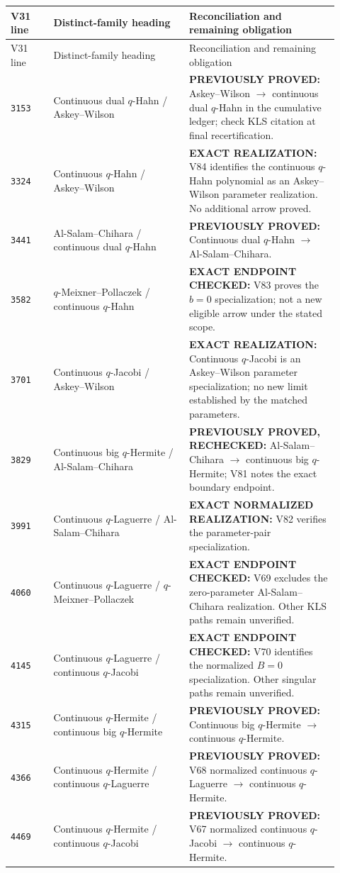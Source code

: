 \documentclass[11pt]{article}
\begin{document}
\begin{longtable}{@{}p{0.12\linewidth}p{0.38\linewidth}p{0.42\linewidth}@{}}
\toprule V31 line & Distinct-family heading & Reconciliation and remaining obligation \\
\midrule\endfirsthead
\toprule V31 line & Distinct-family heading & Reconciliation and remaining obligation \\
\midrule\endhead
\bottomrule\endfoot
\texttt{3153} & Continuous dual $q$-Hahn / Askey--Wilson & \textbf{PREVIOUSLY PROVED:} Askey--Wilson $\to$ continuous dual $q$-Hahn in the cumulative ledger; check KLS citation at final recertification. \\
\texttt{3324} & Continuous $q$-Hahn / Askey--Wilson & \textbf{EXACT REALIZATION:} V84 identifies the continuous $q$-Hahn polynomial as an Askey--Wilson parameter realization. No additional arrow proved. \\
\texttt{3441} & Al-Salam--Chihara / continuous dual $q$-Hahn & \textbf{PREVIOUSLY PROVED:} Continuous dual $q$-Hahn $\to$ Al-Salam--Chihara. \\
\texttt{3582} & $q$-Meixner--Pollaczek / continuous $q$-Hahn & \textbf{EXACT ENDPOINT CHECKED:} V83 proves the $b=0$ specialization; not a new eligible arrow under the stated scope. \\
\texttt{3701} & Continuous $q$-Jacobi / Askey--Wilson & \textbf{EXACT REALIZATION:} Continuous $q$-Jacobi is an Askey--Wilson parameter specialization; no new limit established by the matched parameters. \\
\texttt{3829} & Continuous big $q$-Hermite / Al-Salam--Chihara & \textbf{PREVIOUSLY PROVED, RECHECKED:} Al-Salam--Chihara $\to$ continuous big $q$-Hermite; V81 notes the exact boundary endpoint. \\
\texttt{3991} & Continuous $q$-Laguerre / Al-Salam--Chihara & \textbf{EXACT NORMALIZED REALIZATION:} V82 verifies the parameter-pair specialization. \\
\texttt{4060} & Continuous $q$-Laguerre / $q$-Meixner--Pollaczek & \textbf{EXACT ENDPOINT CHECKED:} V69 excludes the zero-parameter Al-Salam--Chihara realization. Other KLS paths remain unverified. \\
\texttt{4145} & Continuous $q$-Laguerre / continuous $q$-Jacobi & \textbf{EXACT ENDPOINT CHECKED:} V70 identifies the normalized $B=0$ specialization. Other singular paths remain unverified. \\
\texttt{4315} & Continuous $q$-Hermite / continuous big $q$-Hermite & \textbf{PREVIOUSLY PROVED:} Continuous big $q$-Hermite $\to$ continuous $q$-Hermite. \\
\texttt{4366} & Continuous $q$-Hermite / continuous $q$-Laguerre & \textbf{PREVIOUSLY PROVED:} V68 normalized continuous $q$-Laguerre $\to$ continuous $q$-Hermite. \\
\texttt{4469} & Continuous $q$-Hermite / continuous $q$-Jacobi & \textbf{PREVIOUSLY PROVED:} V67 normalized continuous $q$-Jacobi $\to$ continuous $q$-Hermite. \\
\end{longtable}
\end{document}
